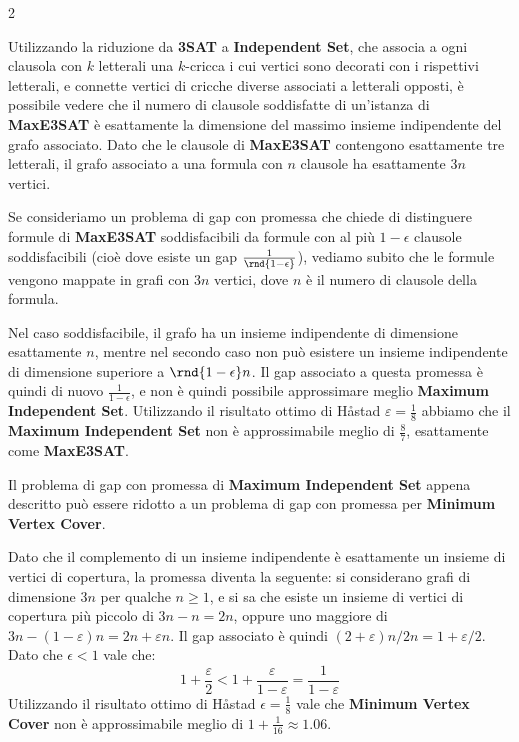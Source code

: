 \documentclass[\main/main.tex]{subfiles}
\begin{document}
\begin{multicols}{2}
\begin{example}
    Utilizzando la riduzione da \textbf{3SAT} a \textbf{Independent Set}, che associa a ogni clausola con \(k\) letterali una \(k\)-cricca i cui vertici sono decorati con i rispettivi letterali, e connette vertici di cricche diverse associati a letterali opposti, è possibile vedere che il numero di clausole soddisfatte di un'istanza di \textbf{MaxE3SAT} è esattamente la dimensione del massimo insieme indipendente del grafo associato. Dato che le clausole di \textbf{MaxE3SAT} contengono esattamente tre letterali, il grafo associato a una formula con \(n\) clausole ha esattamente \(3n\) vertici.
    
    Se consideriamo un problema di gap con promessa che chiede di distinguere formule di \textbf{MaxE3SAT} soddisfacibili da formule con al più \(1-\epsilon\) clausole soddisfacibili (cioè dove esiste un gap \(\frac{1}{\rnd{1-\epsilon}}\)), vediamo subito che le formule vengono mappate in grafi con \(3n\) vertici, dove \(n\) è il numero di clausole della formula.
    
    Nel caso soddisfacibile, il grafo ha un insieme indipendente di dimensione esattamente \(n\), mentre nel secondo caso non può esistere un insieme indipendente di dimensione superiore a \(\rnd{1-\epsilon}n\). Il gap associato a questa promessa è quindi di nuovo \(\frac{1}{1-\epsilon}\), e non è quindi possibile approssimare meglio \textbf{Maximum Independent Set}. Utilizzando il risultato ottimo di Håstad \(\varepsilon=\frac{1}{8}\) abbiamo che il \textbf{Maximum Independent Set} non è approssimabile meglio di \(\frac{8}{7}\), esattamente come \textbf{MaxE3SAT}.
\end{example}
\begin{example}
    Il problema di gap con promessa di \textbf{Maximum Independent Set} appena descritto può essere ridotto a un problema di gap con promessa per \textbf{Minimum Vertex Cover}.
    
    Dato che il complemento di un insieme indipendente è esattamente un insieme di vertici di copertura, la promessa diventa la seguente: si considerano grafi di dimensione \(3n\) per qualche \(n\geq 1\), e si sa che esiste un insieme di vertici di copertura più piccolo di \(3n -n=2n\), oppure uno maggiore di \(3 n-(1-\varepsilon) n= 2 n+\varepsilon n\). Il gap associato è quindi \((2+\varepsilon) n / 2 n=1+\varepsilon / 2\). Dato che \(\epsilon < 1\) vale che:
    \[
        1+\frac{\varepsilon}{2}<1+\frac{\varepsilon}{1-\varepsilon}=\frac{1}{1-\varepsilon}
    \]
    Utilizzando il risultato ottimo di Håstad \(\epsilon = \frac{1}{8}\) vale che \textbf{Minimum Vertex Cover} non è approssimabile meglio di \(1+\frac{1}{16} \approx 1.06\).
\end{example}
\end{multicols}
\clearpage
\end{document}
